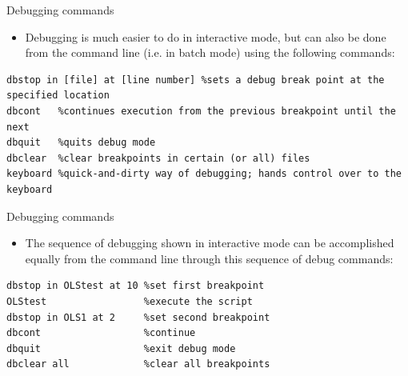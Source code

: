 \documentclass[english,xcolor=dvipsnames]{beamer}
\begin{document}
\begin{frame}[fragile]{Debugging commands}
\begin{itemize}
	\item Debugging is much easier to do in interactive mode, but can also be done from the command line (i.e. in batch mode) using the following commands:
\end{itemize}
\begin{lstlisting}
dbstop in [file] at [line number] %sets a debug break point at the specified location
dbcont   %continues execution from the previous breakpoint until the next
dbquit   %quits debug mode
dbclear  %clear breakpoints in certain (or all) files
keyboard %quick-and-dirty way of debugging; hands control over to the keyboard
\end{lstlisting}
\end{frame}

\begin{frame}[fragile]{Debugging commands}
\begin{itemize}
	\item The sequence of debugging shown in interactive mode can be accomplished equally from the command line through this sequence of debug commands:
\end{itemize}
\begin{lstlisting}
dbstop in OLStest at 10 %set first breakpoint
OLStest                 %execute the script
dbstop in OLS1 at 2     %set second breakpoint
dbcont                  %continue
dbquit                  %exit debug mode
dbclear all             %clear all breakpoints
\end{lstlisting}
\end{frame}
\end{document}
